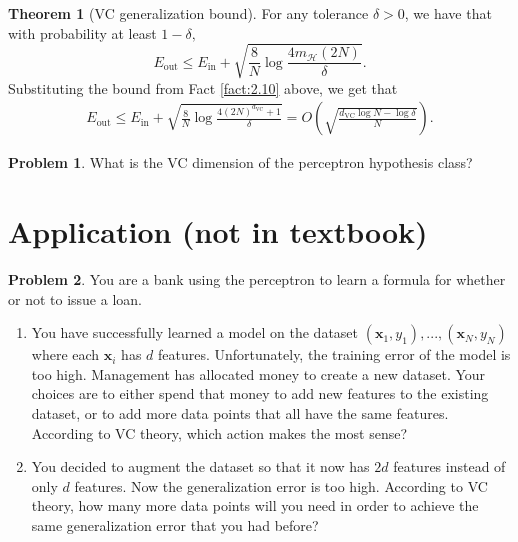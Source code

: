 \documentclass[10pt]{exam}
\theoremstyle{definition}
\newtheorem{problem}{Problem}
\newtheorem{theorem}{Theorem}
\newcommand{\R}{\mathbb R}
\DeclareMathOperator{\sign}{sign}
\newcommand{\Ein}{E_{\text{in}}}
\newcommand{\Eout}{E_{\text{out}}}
\newcommand{\x}{\mathbf x}
\newcommand{\mH}{m_{\mathcal H}}
\newcommand{\dvc}{{d_{\text{VC}}}}
\newcommand{\HH}[1]{\mathcal H_{\text{#1}}}
\begin{document}
\vspace{3in}
\begin{theorem}[VC generalization bound]
    For any tolerance $\delta>0$, we have that with probability at least $1-\delta,$
    \begin{equation}
        \Eout \le \Ein + \sqrt{\frac8N \log\frac{4\mH(2N)}{\delta}}.
    \end{equation}
    Substituting the bound from Fact \ref{fact:2.10} above,
    we get that
    \begin{align}
        \Eout 
        \le \Ein + \sqrt{\frac8N \log\frac{4(2N)^\dvc + 1}{\delta}} 
        = O\left(\sqrt{\frac{\dvc\log N - \log\delta}{N}}\right).
    \end{align}

\end{theorem}

\newpage
\begin{problem}
    What is the VC dimension of the perceptron hypothesis class?
\end{problem}

\newpage
\section*{Application (not in textbook)}
\begin{problem}
    You are a bank using the perceptron to learn a formula for whether or not to issue a loan.
    \begin{enumerate}
        \item
            You have successfully learned a model on the dataset $(\x_1,y_1), ..., (\x_N,y_N)$ where each $\x_i$ has $d$ features.
            Unfortunately, the training error of the model is too high.
            Management has allocated money to create a new dataset.
            Your choices are to either spend that money to add new features to the existing dataset,
            or to add more data points that all have the same features.
            According to VC theory, which action makes the most sense?

            \vspace{4in}
        \item
            You decided to augment the dataset so that it now has $2d$ features instead of only $d$ features.
            Now the generalization error is too high.
            According to VC theory, how many more data points will you need in order to achieve the same generalization error that you had before?
    \end{enumerate}
\end{problem}

%
%
%
\end{document}
